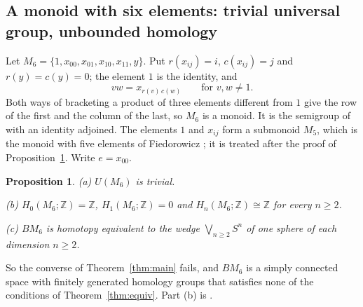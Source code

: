\documentclass[11pt,a4paper]{article}
\newtheorem{proposition}[theorem]{Proposition}
\theoremstyle{definition}
\newcommand{\Z}{\mathbb{Z}}
\begin{document}
\subsection{A monoid with six elements: trivial universal group, unbounded
homology}

Let $M_6=\{1,x_{00},x_{01},x_{10},x_{11},y\}$. Put $r(x_{ij})=i$,
$c(x_{ij})=j$ and $r(y)=c(y)=0$; the element $1$ is the identity, and
\[
 vw=x_{r(v)\,c(w)}\qquad\text{for }v,w\neq1.
\]
Both ways of bracketing a product of three elements different from $1$ give
the row of the first and the column of the last, so $M_6$ is a monoid. It is
the semigroup of \cite[Example~5.2]{Sw} with an identity adjoined. The
elements $1$ and $x_{ij}$ form a submonoid $M_5$, which is the monoid with
five elements of Fiedorowicz \cite[p.~323]{Fie}; it is treated after the
proof of Proposition~\ref{prop:M6}. Write $e=x_{00}$.

\begin{proposition}\label{prop:M6}
\textup{(a)} $U(M_6)$ is trivial.

\textup{(b)} $H_0(M_6;\Z)=\Z$, $H_1(M_6;\Z)=0$ and $H_n(M_6;\Z)\cong\Z$ for
every $n\ge2$.

\textup{(c)} $BM_6$ is homotopy equivalent to the wedge
$\bigvee_{n\ge2}S^n$ of one sphere of each dimension $n\ge2$.
\end{proposition}

So the converse of Theorem~\ref{thm:main} fails, and $BM_6$ is a simply
connected space with finitely generated homology groups that satisfies none
of the conditions of Theorem~\ref{thm:equiv}. Part (b) is
\cite[Example~5.2]{Sw}.
\end{document}
